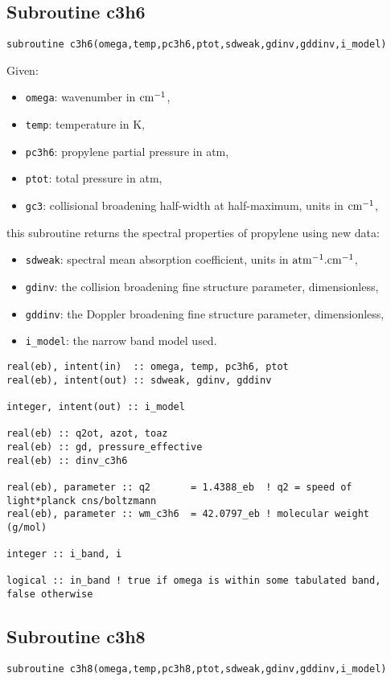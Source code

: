 \subsection{Subroutine c3h6}
\label{sub:c3h6}

\begin{lstlisting}
subroutine c3h6(omega,temp,pc3h6,ptot,sdweak,gdinv,gddinv,i_model)
\end{lstlisting}
Given:
\begin{itemize}
 \item \verb=omega=: wavenumber in $\rm cm^{-1}$,
 \item \verb=temp=: temperature in K,
 \item \verb=pc3h6=: propylene partial pressure in atm,
 \item \verb=ptot=: total pressure in atm,
 \item \verb=gc3=: collisional broadening half-width at half-maximum, units in $\rm cm^{-1}$,
\end{itemize}
this subroutine returns the spectral properties of propylene using new data:
\begin{itemize}
 \item \verb=sdweak=: spectral mean absorption coefficient, units in $\rm atm^{-1}.cm^{-1}$,
 \item \verb=gdinv=: the collision broadening fine structure parameter, dimensionless,
 \item \verb=gddinv=: the Doppler broadening fine structure parameter, dimensionless,
 \item \verb=i_model=: the narrow band model used.
\end{itemize}

\begin{lstlisting}
real(eb), intent(in)  :: omega, temp, pc3h6, ptot
real(eb), intent(out) :: sdweak, gdinv, gddinv

integer, intent(out) :: i_model

real(eb) :: q2ot, azot, toaz
real(eb) :: gd, pressure_effective
real(eb) :: dinv_c3h6

real(eb), parameter :: q2       = 1.4388_eb  ! q2 = speed of light*planck cns/boltzmann
real(eb), parameter :: wm_c3h6  = 42.0797_eb ! molecular weight (g/mol)

integer :: i_band, i

logical :: in_band ! true if omega is within some tabulated band, false otherwise
\end{lstlisting}


\subsection{Subroutine c3h8}
\label{sub:c3h8}
\begin{lstlisting}
subroutine c3h8(omega,temp,pc3h8,ptot,sdweak,gdinv,gddinv,i_model)
\end{lstlisting}

